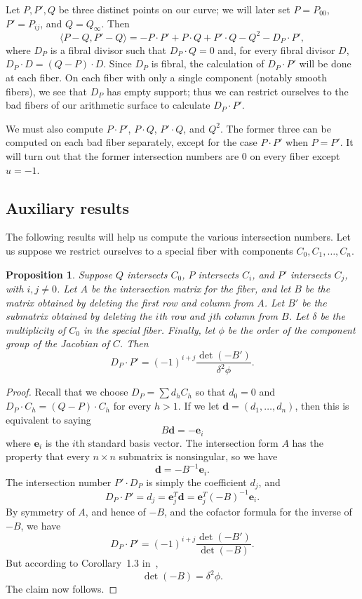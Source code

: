 \documentclass[reqno]{amsart}
\newtheorem{proposition}[thm]{Proposition}
\theoremstyle{definition}
\theoremstyle{remark}
\newcommand{\vd}{\mathbf{d}}
\newcommand{\ve}{\mathbf{e}}
\begin{document}
Let $P, P', Q$ be three distinct points on our curve; we will later set $P = P_{00}$, $P' = P_{ij}$, and $Q = Q_\infty$. Then
\[
\langle P - Q, P' - Q\rangle = -P \cdot P' + P \cdot Q + P' \cdot Q - Q^2 - D_P \cdot P',
\]
 where $D_P$ is a fibral divisor such that $D_P \cdot Q = 0$ and, for every fibral divisor $D$, $D_P \cdot D = (Q - P) \cdot D$. Since $D_P$ is fibral, the calculation of $D_P \cdot P'$ will be done at each fiber. On each fiber with only a single component (notably smooth fibers), we see that $D_P$ has empty support; thus we can restrict ourselves to the bad fibers of our arithmetic surface to calculate $D_P \cdot P'$. 

We must also compute $P \cdot P'$, $P \cdot Q$, $P' \cdot Q$, and $Q^2$. The former three can be computed on each bad fiber separately, except for the case $P \cdot P'$ when $P = P'$. It will turn out that the former intersection numbers are 0 on every fiber except $u = -1$. 


\subsection{Auxiliary results}
\label{sec:auxiliary-results}

The following results will help us compute the various intersection numbers. Let us suppose we restrict ourselves to a special fiber with components $C_0, C_1, \dots, C_n$.

\begin{proposition}\label{prop:dp-dot-p-cofactor}
  Suppose $Q$ intersects $C_0$, $P$ intersects $C_i$, and $P'$ intersects $C_j$, with $i,j \neq 0$. Let $A$ be the intersection matrix for the fiber, and let $B$ be the matrix obtained by deleting the first row and column from $A$. Let $B'$ be the submatrix obtained by deleting the $i$th row and $j$th column from $B$. Let $\delta$ be the multiplicity of $C_0$ in the special fiber. Finally, let $\phi$ be the order of the component group of the Jacobian of $C$. Then
  \[
  D_P \cdot P' = (-1)^{i+j} \frac{\det (-B')}{\delta^2 \phi}.
  \]
\end{proposition}

\begin{proof}
  Recall that we choose $D_P = \sum d_h C_h$ so that $d_0 = 0$ and $D_P \cdot C_h = (Q - P) \cdot C_h$ for every $h > 1$. If we let $\vd = (d_1, \dots, d_n)$, then this is equivalent to saying
  \[
  B\vd = -\ve_i
  \]
  where $\ve_i$ is the $i$th standard basis vector. The intersection form $A$ has the property that every $n \times n$ submatrix is nonsingular, so we have
  \[
  \vd = -B^{-1}\ve_i.
  \]
  The intersection number $P' \cdot D_P$ is simply the coefficient $d_j$, and
  \[
  D_P \cdot P' = d_j = \ve_j^T \vd = \ve_j^T(-B)^{-1}\ve_i.
  \]
  By symmetry of $A$, and hence of $-B$, and the cofactor formula for the inverse of $-B$, we have
  \[
  D_P \cdot P' = (-1)^{i+j} \frac{\det(-B')}{\det(-B)}.
  \]
  But according to Corollary~1.3 in~\cite{lorenzini},
  \[
  \det (-B) = \delta^2 \phi.
  \]
  The claim now follows.
\end{proof}
\end{document}
